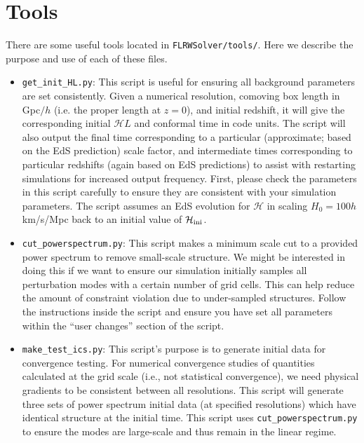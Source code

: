 \section{Tools}

There are some useful tools located in \texttt{FLRWSolver/tools/}. Here we describe the purpose and use of each of these files.
\begin{itemize}

\item \texttt{get\_init\_HL.py}: This script is useful for ensuring all background parameters are set consistently. Given a numerical resolution, comoving box length in Gpc$/h$ (i.e. the proper length at $z=0$), and initial redshift, it will give the corresponding initial $\mathcal{H}L$ and conformal time in code units. The script will also output the final time corresponding to a particular (approximate; based on the EdS prediction) scale factor, and intermediate times corresponding to particular redshifts (again based on EdS predictions) to assist with restarting simulations for increased output frequency. 
First, please check the parameters in this script carefully to ensure they are consistent with your simulation parameters. The script assumes an EdS evolution for $\mathcal{H}$ in scaling $H_0=100 h$ km/s/Mpc back to an initial value of $\mathcal{H}_{\rm ini}$.

\item \texttt{cut\_powerspectrum.py}: This script makes a minimum scale cut to a provided power spectrum to remove small-scale structure. We might be interested in doing this if we want to ensure our simulation initially samples all perturbation modes with a certain number of grid cells. This can help reduce the amount of constraint violation due to under-sampled structures. Follow the instructions inside the script and ensure you have set all parameters within the ``user changes'' section of the script. 

\item \texttt{make\_test\_ics.py}: This script's purpose is to generate initial data for convergence testing. For numerical convergence studies of quantities calculated at the grid scale (i.e., not statistical convergence), we need physical gradients to be consistent between all resolutions. This script will generate three sets of power spectrum initial data (at specified resolutions) which have identical structure at the initial time. This script uses \texttt{cut\_powerspectrum.py} to ensure the modes are large-scale and thus remain in the linear regime.


\end{itemize}

